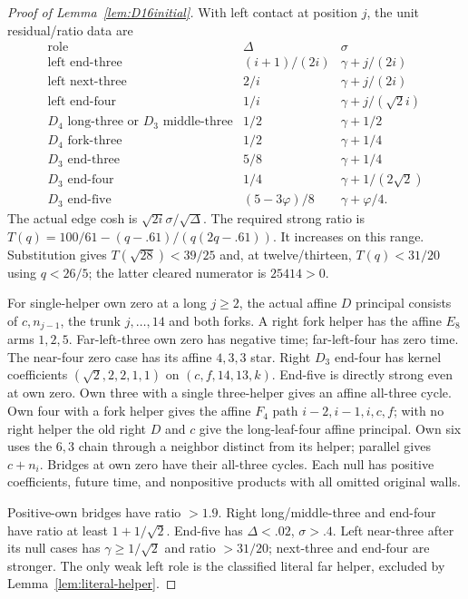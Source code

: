 \documentclass[11pt]{article}
\begin{document}
\begin{proof}[Proof of Lemma~\ref{lem:D16initial}]
With left contact at position $j$, the unit residual/ratio data are
\[
\begin{array}{c|c|c}
\text{role}&\Delta&\sigma\\\hline
\text{left end-three}&(i+1)/(2i)&\gamma+j/(2i)\\
\text{left next-three}&2/i&\gamma+j/(2i)\\
\text{left end-four}&1/i&\gamma+j/(\sqrt2i)\\
D_4\text{ long-three or }D_3\text{ middle-three}&1/2&\gamma+1/2\\
D_4\text{ fork-three}&1/2&\gamma+1/4\\
D_3\text{ end-three}&5/8&\gamma+1/4\\
D_3\text{ end-four}&1/4&\gamma+1/(2\sqrt2)\\
D_3\text{ end-five}&(5-3\varphi)/8&\gamma+\varphi/4 .
\end{array}
\]
The actual edge cosh is $\sqrt{2i}\sigma/\sqrt\Delta$.
The required strong ratio is
$T(q)=100/61-(q-.61)/(q(2q-.61))$.
It increases on this range. Substitution gives
$T(\sqrt{28})<39/25$ and, at twelve/thirteen,
$T(q)<31/20$ using $q<26/5$; the latter cleared numerator is
$25414>0$.

For single-helper own zero at a long $j\ge2$, the actual affine
$D$ principal consists of $c,n_{j-1}$, the trunk $j,\ldots,14$
and both forks. A right fork helper has the affine $E_8$ arms
$1,2,5$. Far-left-three own zero has negative time; far-left-four
has zero time. The near-four zero case has its affine $4,3,3$ star.
Right $D_3$ end-four has kernel coefficients
$(\sqrt2,2,2,1,1)$ on $(c,f,14,13,k)$.
End-five is directly strong even at own zero.
Own three with a single three-helper gives an affine all-three
cycle. Own four with a fork helper gives the affine $F_4$ path
$i-2,i-1,i,c,f$; with no right helper the old right $D$ and
$c$ give the long-leaf-four affine principal.
Own six uses the $6,3$ chain through a neighbor distinct from its
helper; parallel gives $c+n_i$. Bridges at own zero have their
all-three cycles. Each null has positive coefficients, future
time, and nonpositive products with all omitted original walls.

Positive-own bridges have ratio $>1.9$. Right long/middle-three
and end-four have ratio at least $1+1/\sqrt2$.
End-five has $\Delta<.02$, $\sigma>.4$.
Left near-three after its null cases has $\gamma\ge1/\sqrt2$
and ratio $>31/20$; next-three and end-four are stronger.
The only weak left role is the classified literal far helper,
excluded by Lemma~\ref{lem:literal-helper}.


\end{proof}
\end{document}
